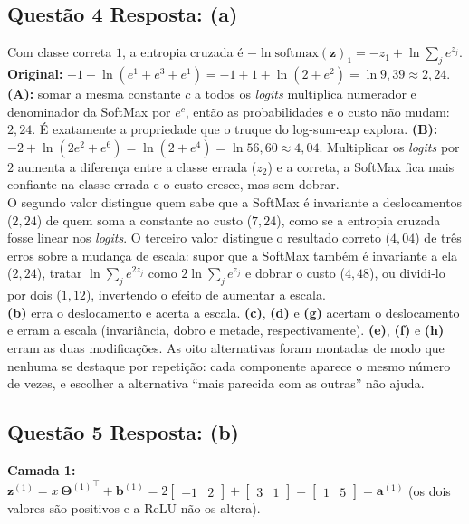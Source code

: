 \documentclass[11pt,a4paper]{article}
\begin{document}
\subsection*{Questão 4 \textemdash{} Resposta: (a)}
Com classe correta $1$, a entropia cruzada é $-\ln \mathrm{softmax}(\mathbf{z})_1 = -z_1 + \ln\sum_j e^{z_j}$.
\textbf{Original:} $-1 + \ln(e^1 + e^3 + e^1) = -1 + 1 + \ln(2 + e^{2}) = \ln 9{,}39 \approx 2{,}24$.
\textbf{(A):} somar a mesma constante $c$ a todos os \textit{logits} multiplica numerador e denominador da SoftMax por $e^{c}$, então as probabilidades e o custo não mudam: $2{,}24$. É exatamente a propriedade que o truque do log-sum-exp explora.
\textbf{(B):} $-2 + \ln(2e^{2} + e^{6}) = \ln(2 + e^{4}) = \ln 56{,}60 \approx 4{,}04$. Multiplicar os \textit{logits} por $2$ aumenta a diferença entre a classe errada ($z_2$) e a correta, a SoftMax fica mais confiante na classe errada e o custo cresce, mas sem dobrar.\\
O segundo valor distingue quem sabe que a SoftMax é invariante a deslocamentos ($2{,}24$) de quem soma a constante ao custo ($7{,}24$), como se a entropia cruzada fosse linear nos \textit{logits}. O terceiro valor distingue o resultado correto ($4{,}04$) de três erros sobre a mudança de escala: supor que a SoftMax também é invariante a ela ($2{,}24$), tratar $\ln\sum_j e^{2z_j}$ como $2\ln\sum_j e^{z_j}$ e dobrar o custo ($4{,}48$), ou dividi-lo por dois ($1{,}12$), invertendo o efeito de aumentar a escala.\\
\textbf{(b)} erra o deslocamento e acerta a escala.
\textbf{(c)}, \textbf{(d)} e \textbf{(g)} acertam o deslocamento e erram a escala (invariância, dobro e metade, respectivamente).
\textbf{(e)}, \textbf{(f)} e \textbf{(h)} erram as duas modificações.
As oito alternativas foram montadas de modo que nenhuma se destaque por repetição: cada componente aparece o mesmo número de vezes, e escolher a alternativa ``mais parecida com as outras'' não ajuda.

\subsection*{Questão 5 \textemdash{} Resposta: (b)}
\textbf{Camada 1:} $\mathbf{z}^{(1)} = x\,{\mathbf{\Theta}^{(1)}}^{\top} + \mathbf{b}^{(1)} = 2\begin{bmatrix} -1 & 2 \end{bmatrix} + \begin{bmatrix} 3 & 1 \end{bmatrix} = \begin{bmatrix} 1 & 5 \end{bmatrix} = \mathbf{a}^{(1)}$ (os dois valores são positivos e a ReLU não os altera).
\end{document}
